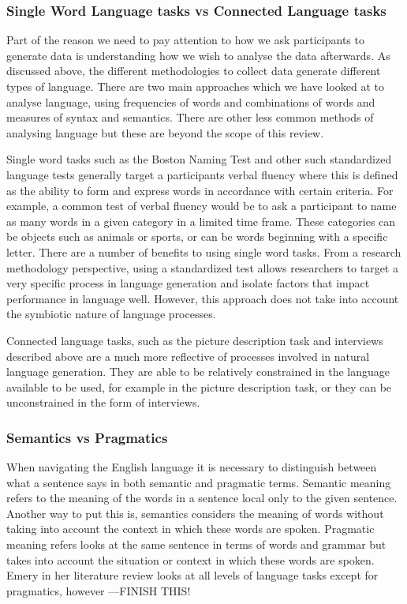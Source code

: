 \documentclass{article}
\begin{document}
\subsubsection{Single Word Language tasks vs Connected Language tasks}
Part of the reason we need to pay attention to how we ask participants to generate data is understanding how we wish to analyse the data afterwards. As discussed above, the different methodologies to collect data generate different types of language. There are two main approaches which we have looked at to analyse language, using frequencies of words and combinations of words and measures of syntax and semantics. There are other less common methods of analysing language but these are beyond the scope of this review.
\par
Single word tasks such as the Boston Naming Test and other such standardized language tests generally target a participants verbal fluency where this is defined as the ability to form and express words in accordance with certain criteria. For example, a common test of verbal fluency would be to ask a participant to name as many words in a given category in a limited time frame. These categories can be objects such as animals or sports, or can be words beginning with a specific letter. There are a number of benefits to using single word tasks. From a research methodology perspective, using a standardized test allows researchers to target a very specific process in language generation and isolate factors that impact performance in language well. However, this approach does not take into account the symbiotic nature of language processes.
\par
Connected language tasks, such as the picture description task and interviews described above are a much more reflective of processes involved in natural language generation. They are able to be relatively constrained in the language available to be used, for example in the picture description task, or they can be unconstrained in the form of interviews.
\par
\subsubsection{Semantics vs Pragmatics}
When navigating the English language it is necessary to distinguish between what a sentence says in both semantic and pragmatic terms. Semantic meaning refers to the meaning of the words in a sentence local only to the given sentence. Another way to put this is, semantics considers the meaning of words without taking into account the context in which these words are spoken. Pragmatic meaning refers looks at the same sentence in terms of words and grammar but takes into account the situation or context in which these words are spoken. Emery in her literature review looks at all levels of language tasks except for pragmatics, however ---FINISH THIS!
\par
\end{document}
